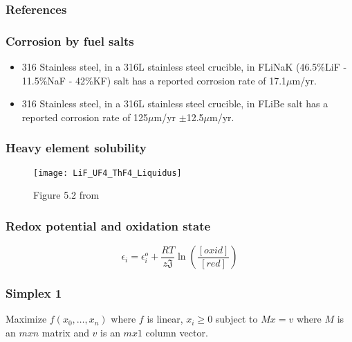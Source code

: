 \documentclass{beamer}
\begin{document}
\begin{frame}[allowframebreaks]
\frametitle{References}

%

\end{frame}

\begin{frame}
\frametitle{Corrosion by fuel salts}

    \begin{itemize}
        \item 316 Stainless steel, in a 316L stainless steel crucible, in FLiNaK (46.5\%LiF - 11.5\%NaF - 42\%KF) salt has a reported corrosion rate of 17.1$\mu$m/yr. \cite{zheng_corrosion_2015}
        \item 316 Stainless steel, in a 316L stainless steel crucible, in FLiBe salt has a reported corrosion rate of 125$\mu$m/yr $\pm$12.5$\mu$m/yr. \cite{sellers_materials_2012}
    \end{itemize}

\end{frame}

\begin{frame}
\frametitle{Heavy element solubility}

    \begin{figure}
        \centering
        \texttt{[image: LiF\_UF4\_ThF4\_Liquidus]}
        \caption{Figure 5.2 from \cite{rosenthal_development_1972}}
        \label{fig:lifufthf_liquidus}
    \end{figure}

\end{frame}

\begin{frame}
\frametitle{Redox potential and oxidation state}

    \begin{equation}
    \label{Nernst}
        \epsilon_{i} = \epsilon_{i}^{o} + \frac{RT}{z\mathfrak{J}}\ln\left(\frac{[oxid]}{[red]}\right)
    \end{equation}

\end{frame}

\begin{frame}
\frametitle{Simplex 1}

    Maximize $f(x_{0},\ldots,x_{n})$ where $f$ is linear, $x_{i}\geq0$ subject
    to $Mx=v$ where $M$ is an $mxn$ matrix and $v$ is an $mx1$ column vector.

\end{frame}
\end{document}
